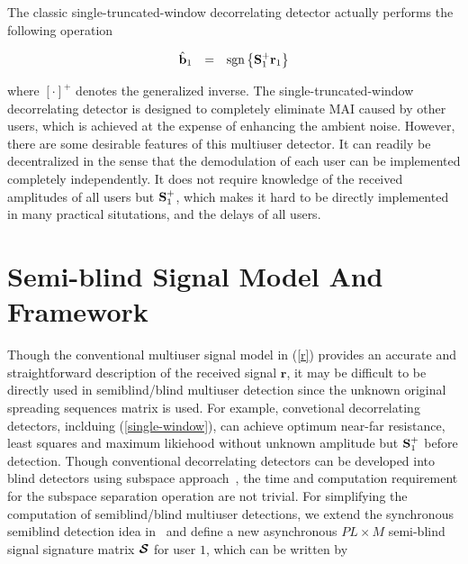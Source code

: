 \documentclass[a4paper,10pt,fleqn, twocolumn]{IEEETran}
\newcommand{\br}{{\mathbf r}}
\newcommand{\bb}{{\bf b}}
\newcommand{\bS}{{\bf S}}
\newcommand{\bcS}{{\mbox {\boldmath ${\cal S}$}}}
\begin{document}
The classic single-truncated-window decorrelating detector
actually performs the following operation

\begin{equation}
\begin{array}{rcl}
\hat{\bb}_1&=&\mbox{sgn}\left\{\bS_1^{+}\br_1\right\}
\end{array}\label{single-window}
\end{equation}

\noindent where $[\cdot]^+$ denotes the generalized inverse. The
single-truncated-window decorrelating detector is designed to
completely eliminate MAI caused by other users, which is achieved
at the expense of enhancing the ambient noise. However, there are
some desirable features of this multiuser detector. It can readily
be decentralized in the sense that the demodulation of each user
can be implemented completely independently. It does not require
knowledge of the received amplitudes of all users but $\bS_1^+$,
which makes it hard to be directly implemented in many practical
situtations, and the delays of all users.

\section{Semi-blind Signal Model And Framework}
\begin{figure} \label{MUD_model}
\end{figure}
Though the conventional multiuser signal model in (\ref{r})
provides an accurate and straightforward description of the
received signal $\br$, it may be difficult to be directly used in
semiblind/blind multiuser detection since the unknown original
spreading sequences matrix is used. For example, convetional
decorrelating detectors, inclduing (\ref{single-window}), can
achieve optimum near-far resistance, least squares and maximum
likiehood without unknown amplitude but $\bS_1^{+}$ before
detection. Though conventional decorrelating detectors can be
developed into blind detectors using subspace
approach~\cite{Wang98}, the time and computation requirement for
the subspace separation operation are not trivial. For simplifying
the computation of semiblind/blind multiuser detections, we extend
the synchronous semiblind detection idea in~\cite{Wang03d,Wang03e}
and define a new asynchronous $PL\times M$ semi-blind signal
signature matrix $\bcS$ for user $1$, which can be written by
\end{document}
